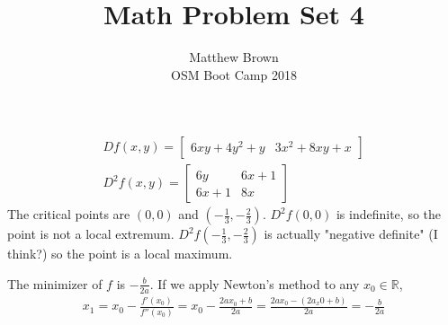 \documentclass[12pt]{article}
\newenvironment{problem}[2][Problem]{\begin{trivlist}
\item[\hskip \labelsep {\bfseries #1}\hskip \labelsep {\bfseries #2.}]}{\end{trivlist}}
\theoremstyle{definition}
\theoremstyle{definition}
\theoremstyle{definition}
\theoremstyle{definition}
\begin{document}
\title{Math Problem Set 4}
\author{Matthew Brown\\ 
OSM Boot Camp 2018} %
 
\maketitle
 
\begin{problem}{6.6}
\end{problem}
\begin{align*}
Df(x, y) = \begin{bmatrix}
6xy +4y^2 + y & 3x^2 +8xy + x
\end{bmatrix} \\
D^2f(x, y) = \begin{bmatrix}
6y & 6x + 1 \\
6x + 1 & 8x
\end{bmatrix}
\end{align*}
The critical points are $(0,0)$ and $(-\frac{1}{3}, -\frac{2}{3})$. $D^2f(0, 0)$ is indefinite, so the point is not a local extremum. $D^2f(-\frac{1}{3}, -\frac{2}{3})$ is actually "negative definite" (I think?) so the point is a local maximum.

\begin{problem}{6.11}
The minimizer of $f$ is $-\frac{b}{2a}$. If we apply Newton's method to any $x_0 \in \mathbb{R}$, 
\begin{align*}
x_1 = x_0 - \frac{f'(x_0)}{f''(x_0)} = x_0 - \frac{2ax_0+b}{2a} = \frac{2ax_0 - (2a_x0 +b)}{2a}= -\frac{b}{2a}
\end{align*}
\end{problem}
\end{document}
